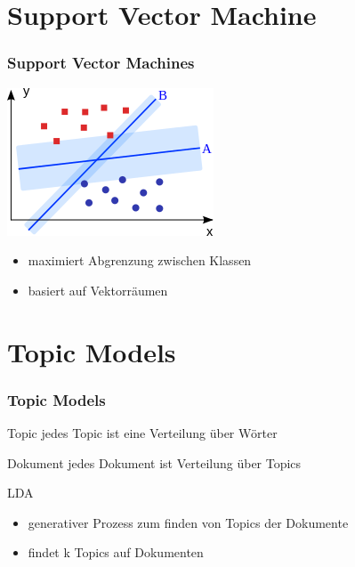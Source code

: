 \documentclass[12pt, xcolor=table]{beamer}
\begin{document}
\section{Support Vector Machine} %
\label{sec:SVM}

\begin{frame}
    \frametitle{Support Vector Machines}
    \begin{center}
    \includegraphics[scale=0.75]{figures/Svm_intro.png}
    \end{center}
    \begin{itemize}
        \item maximiert Abgrenzung zwischen Klassen
        \item basiert auf Vektorräumen
    \end{itemize}
\end{frame}

\section{Topic Models} %
\label{sec:LDA}

\begin{frame}
    \frametitle{Topic Models}
    \begin{block}{Topic}
        jedes Topic ist eine Verteilung über Wörter
    \end{block}
    \begin{block}{Dokument}
        jedes Dokument ist Verteilung über Topics
    \end{block}
    \begin{block}{LDA}
        \begin{itemize}
            \item generativer Prozess zum finden von Topics der Dokumente
            \item findet k Topics auf Dokumenten
        \end{itemize}
    \end{block}
\end{frame}
\end{document}
